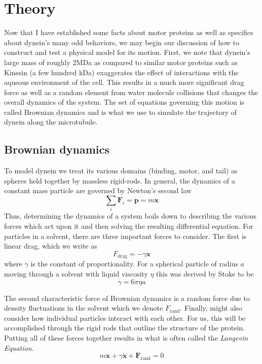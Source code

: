 \section{Theory}
Now that I have established some facts about motor proteins as well as specifics about dynein's many odd behaviors, we may begin our discussion of how to construct and test a physical model for its motion. First, we note that dynein's large mass of roughly 2MDa \cite{johnson_structure_1983} as compared to similar motor proteins such as Kinesin (a few hundred kDa) \cite{liao_kinesin_1998} exaggerates the effect of interactions with the  aqueous environment of the cell. This results in a much more significant drag force as well as a random element from water molecule collisions that changes the overall dynamics of the system. The set of equations governing this motion is called Brownian dynamics and is what we use to simulate the trajectory of dynein along the microtubule. 
	\subsection{Brownian dynamics}
	To model dynein we treat its various domains (binding, motor, and tail) as spheres held together by massless rigid-rods. In general, the dynamics of a constant mass particle are governed by Newton's second law
	\begin{equation}
		\sum_i \mathbf{F}_i = \dot{\mathbf{p}} = m\ddot{\mathbf{x}}
	\end{equation}
	Thus, determining the dynamics of a system boils down to describing the various forces which act upon it and then solving the resulting differential equation. For particles in a solvent, there are three important forces to consider. The first is linear drag, which we write as 
	\begin{equation}
		F_\text{drag} = -\gamma\dot{\mathbf{x}}
	\end{equation}
	where $\gamma$ is the constant of proportionality. For a spherical particle of radius $a$ moving through a solvent with liquid viscosity $\eta$ this was derived by Stoke to be 
	\begin{equation}
		\gamma = 6\pi\eta a
	\end{equation}
	
	
	The second characteristic force of Brownian dynamics is a random force due to density fluctuations in the solvent which we denote $F_\text{rand}$. Finally, might also consider how individual particles interact with each other. For us, this will be accomplished through the rigid rods that outline the structure of the protein. Putting all of these forces together results in what is often called the \textit{Langevin Equation}.
	\begin{equation}
		m\ddot{\mathbf{x}} + \gamma\dot{\mathbf{x}}+\mathbf{F}_\text{rand} = 0 
	\end{equation}
	
